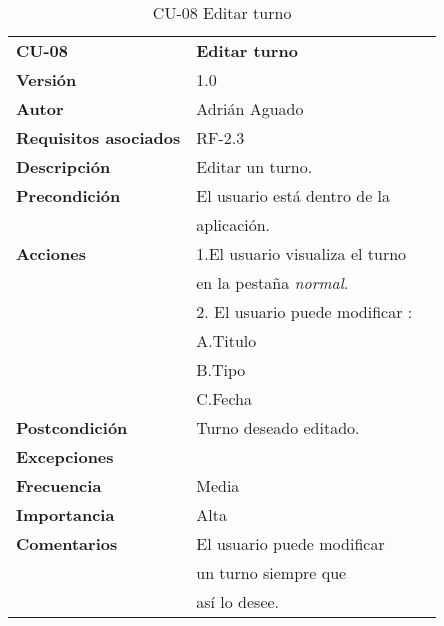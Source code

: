 \begin{table}
\begin{tabular}{llr}  
\toprule
\begin{minipage}[b]{0.24\columnwidth}\raggedright\strut
\textbf{CU-08}\strut
\end{minipage} & \begin{minipage}[b]{0.72\columnwidth}\raggedright\strut
\textbf{Editar turno}\strut
\end{minipage}\tabularnewline
\cmidrule(r){1-2}
\textbf{Versión}       & 1.0           \\
\textbf{Autor}       & Adrián  Aguado    \\
\textbf{Requisitos asociados}       & RF-2.3 \\ 
\textbf{Descripción} & Editar un turno.\\
\textbf{Precondición} & El usuario está dentro de la \\
& aplicación. \\
\textbf{Acciones} & 1.El usuario visualiza el turno  \\
& en la pestaña  \emph{normal}. \\
& 2. El usuario puede modificar :      \\
& A.Titulo \\
& B.Tipo \\
& C.Fecha\\
\textbf{Postcondición} & Turno deseado editado.\\
\textbf{Excepciones} &     \\
\textbf{Frecuencia} & Media          \\
\textbf{Importancia} & Alta            \\
\textbf{Comentarios } &    El usuario puede modificar  \\
&  un turno siempre que  \\
&  así lo desee.  \\
\bottomrule
\end{tabular}
\caption{CU-08 Editar turno} 
\end{table}

